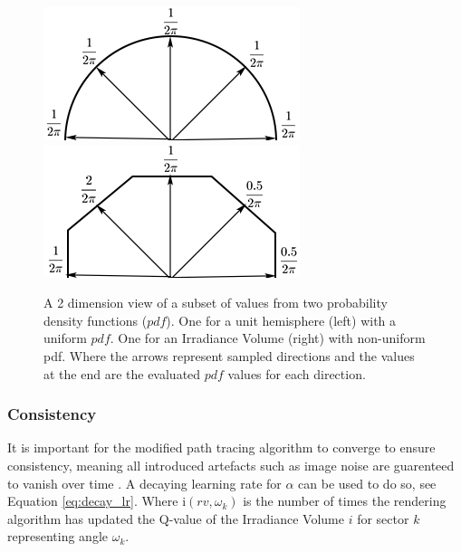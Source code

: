 \documentclass[../dissertation.tex]{subfiles}
\begin{document}
\begin{figure}[h]
\centering
{}
  \includegraphics[width=\textwidth]{images/uniform_pdf.png}   
  \label{fig:uniform_pdf}
\endminipage\hspace{5em}
  \includegraphics[width=\textwidth]{images/not_uniform_pdf.png}
  \label{fig:not_uniform_pdf}
\endminipage
\caption{A 2 dimension view of a subset of values from two probability density functions ($pdf$). One for a unit hemisphere (left) with a uniform $pdf$. One for an Irradiance Volume (right) with non-uniform pdf. Where the arrows represent sampled directions and the values at the end are the evaluated $pdf$ values for each direction.}
\label{fig:pdfs}
\end{figure}

\subsubsection*{Consistency}
It is important for the modified path tracing algorithm to converge to ensure consistency, meaning all introduced artefacts such as image noise are guarenteed to vanish over time \cite{dahm2017learning}. A decaying learning rate for $\alpha$ can be used to do so, see Equation \ref{eq:decay_lr}. Where $\text{i}(rv, \omega_k)$ is the number of times the rendering algorithm has updated the Q-value of the Irradiance Volume $i$ for sector $k$ representing angle $\omega_k$.
\end{document}
